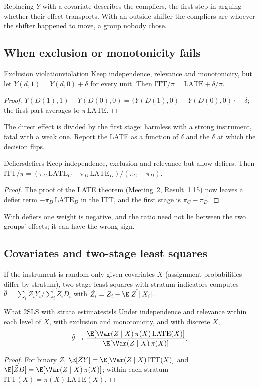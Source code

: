 \documentclass[11pt]{article}
\begin{document}
Replacing $Y$ with a covariate describes the compliers, the first step in arguing whether their effect transports. With an
outside shifter the compliers are whoever the shifter happened to move, a group nobody chose.

\subsection{When exclusion or monotonicity fails}

\begin{prop}{Exclusion violation}{violation}
Keep independence, relevance and monotonicity, but let $Y(d,1) = Y(d,0) + \delta$ for every unit. Then
$\text{ITT}/\pi = \text{LATE} + \delta/\pi$.
\end{prop}
\begin{proof}
$Y(D(1),1) - Y(D(0),0) = \{Y(D(1),0) - Y(D(0),0)\} + \delta$; the first part averages to $\pi\,\text{LATE}$.
\end{proof}

The direct effect is divided by the first stage: harmless with a strong instrument, fatal with a weak one. Report the LATE as a
function of $\delta$ and the $\delta$ at which the decision flips.

\begin{prop}{Defiers}{defiers}
Keep independence, exclusion and relevance but allow defiers. Then
$\text{ITT}/\pi = (\pi_C\,\text{LATE}_C - \pi_D\,\text{LATE}_D)/(\pi_C - \pi_D)$.
\end{prop}
\begin{proof}
The proof of the LATE theorem (Meeting~2, Result~1.15) now leaves a defier term $-\pi_D\,\text{LATE}_D$ in the ITT, and the first
stage is $\pi_C - \pi_D$.
\end{proof}

With defiers one weight is negative, and the ratio need not lie between the two groups' effects; it can have the wrong sign.

\subsection{Covariates and two-stage least squares}

If the instrument is random only given covariates $X$ (assignment probabilities differ by stratum), two-stage least squares with
stratum indicators computes $\hat\theta = \sum_i\tilde Z_iY_i/\sum_i\tilde Z_iD_i$ with $\tilde Z_i = Z_i - \hat\E[Z \mid X_i]$.

\begin{prop}{What 2SLS with strata estimates}{tsls}
Under independence and relevance within each level of $X$, with exclusion and monotonicity, and with discrete $X$,
\[
  \hat\theta \to \frac{\E[\Var(Z \mid X)\,\pi(X)\,\text{LATE}(X)]}{\E[\Var(Z \mid X)\,\pi(X)]}.
\]
\end{prop}
\begin{proof}
For binary $Z$, $\E[\tilde ZY] = \E[\Var(Z \mid X)\,\text{ITT}(X)]$ and $\E[\tilde ZD] = \E[\Var(Z \mid X)\,\pi(X)]$; within each stratum
$\text{ITT}(X) = \pi(X)\,\text{LATE}(X)$.
\end{proof}
\end{document}
